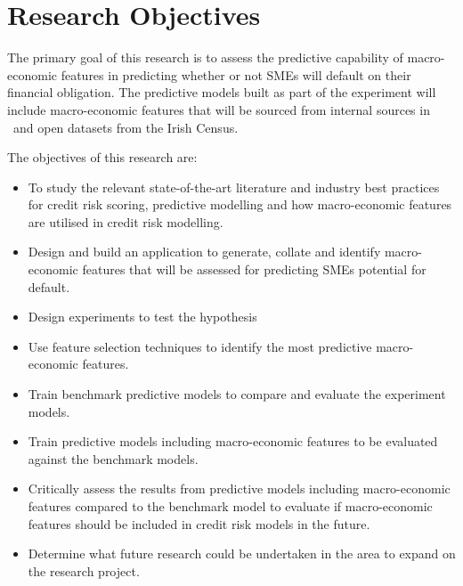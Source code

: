 \section{Research Objectives}
The primary goal of this research is to assess the predictive capability of macro-economic features in predicting whether or not SMEs will default on their financial obligation. The predictive models built as part of the experiment will include macro-economic features that will be sourced from internal sources in \subjectname\ and open datasets from the Irish Census.

 
The objectives of this research are:
\begin{itemize}
	\item To study the relevant state-of-the-art literature and industry best practices for credit risk scoring, predictive modelling and how macro-economic features are utilised in credit risk modelling.
	
	\item Design and build an application to generate, collate and identify macro-economic features that will be assessed for predicting SMEs potential for default.
	
	\item Design experiments to test the hypothesis
	
	\item Use feature selection techniques to identify the most predictive  macro-economic features.
	
	\item Train benchmark predictive models to compare and evaluate the experiment models.
	
	\item Train predictive models including macro-economic features to be evaluated against the benchmark models.

	\item Critically assess the results from predictive models including macro-economic features compared to the benchmark model to evaluate if macro-economic features should be included in credit risk models in the future.

	\item Determine what future research could be undertaken in the area to expand on the research project.
\end{itemize}
	

